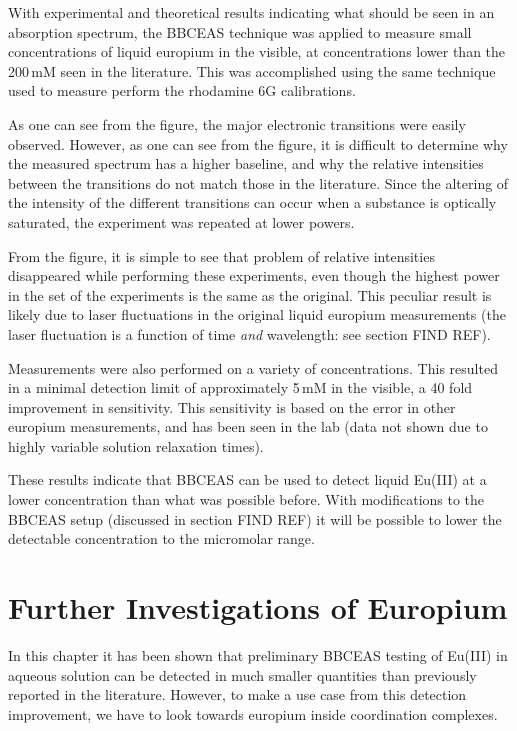 With experimental and theoretical results indicating what should be seen in an absorption spectrum, the \ac{BBCEAS} technique was applied to measure small concentrations of liquid europium in the visible, at concentrations lower than the 200\,mM seen in the literature. This was accomplished using the same technique used to measure perform the rhodamine 6G calibrations.

As one can see from the figure, the major electronic transitions were
easily observed. However, as one can see from the figure, it is difficult
to determine why the measured spectrum has a higher baseline, and why the
relative intensities between the transitions do not match those in the
literature. Since the altering of the intensity of the different transitions
can occur when a substance is optically saturated, the experiment was repeated
at lower powers.

From the figure, it is simple to see that problem of relative intensities
disappeared while performing these experiments, even though the highest power
in the set of the experiments is the same as the original. This peculiar
result is likely due to laser fluctuations in the original liquid europium
measurements (the laser fluctuation is a function of time \emph{and} wavelength: see section FIND REF).

Measurements were also performed on a variety of concentrations. This resulted
in a minimal detection limit of approximately 5\,mM in the visible, a 40 fold
improvement in sensitivity. This sensitivity is based on the error in other
europium measurements, and has been seen in the lab (data not shown due to
highly variable solution relaxation times).

These results indicate that \ac{BBCEAS} can be used to detect liquid Eu(III)
at a lower concentration than what was possible before. With modifications to
the \ac{BBCEAS} setup (discussed in section FIND REF) it will be possible to
lower the detectable concentration to the micromolar range.

\section{Further Investigations of Europium}

In this chapter it has been shown that preliminary \ac{BBCEAS} testing of Eu(III) in aqueous solution can be detected in much smaller quantities than previously reported in the literature. However, to make a use case from this detection improvement, we have to look towards europium inside coordination complexes.

